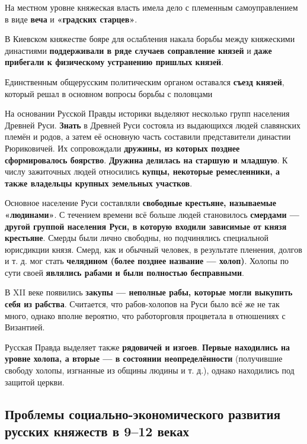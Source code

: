 \documentclass{article}
\begin{document}
На местном уровне княжеская власть имела дело с племенным самоуправлением в виде \textbf{веча} и \textbf{«градских старцев»}.

\hfill

В Киевском княжестве бояре для ослабления накала борьбы между княжескими династиями \textbf{поддерживали в ряде случаев соправление князей} и \textbf{даже прибегали к физическому устранению пришлых князей}.

Единственным общерусским политическим органом оставался \textbf{съезд князей}, который решал в основном вопросы борьбы с половцами

\hfill

На основании Русской Правды историки выделяют несколько групп населения Древней Руси. \textbf{Знать} в Древней Руси состояла из выдающихся людей славянских племён и родов, а затем её основную часть составили представители династии Рюриковичей. Их сопровождали \textbf{дружины, из которых позднее сформировалось боярство}. \textbf{Дружина делилась на старшую и младшую}. К числу зажиточных людей относились \textbf{купцы, некоторые ремесленники, а также владельцы крупных земельных участков}.

\hfill

Основное население Руси составляли \textbf{свободные крестьяне, называемые «людинами»}. С течением времени всё больше людей становилось \textbf{смердами — другой группой населения Руси, в которую входили зависимые от князя крестьяне}. Смерды были лично свободны, но подчинялись специальной юрисдикции князя. Смерд, как и обычный человек, в результате пленения, долгов и т. д. мог стать \textbf{челядином (более позднее название — холоп)}. Холопы по сути своей \textbf{являлись рабами и были полностью бесправными}.

В XII веке появились \textbf{закупы — неполные рабы, которые могли выкупить себя из рабства}. Считается, что рабов-холопов на Руси было всё же не так много, однако вполне вероятно, что работорговля процветала в отношениях с Византией.

Русская Правда выделяет также \textbf{рядовичей и изгоев}. \textbf{Первые находились на уровне холопа, а вторые — в состоянии неопределённости} (получившие свободу холопы, изгнанные из общины людины и т. д.), однако находились под защитой церкви. 

\subsection{Проблемы социально-экономического развития русских княжеств в 9–12 веках}
\end{document}
